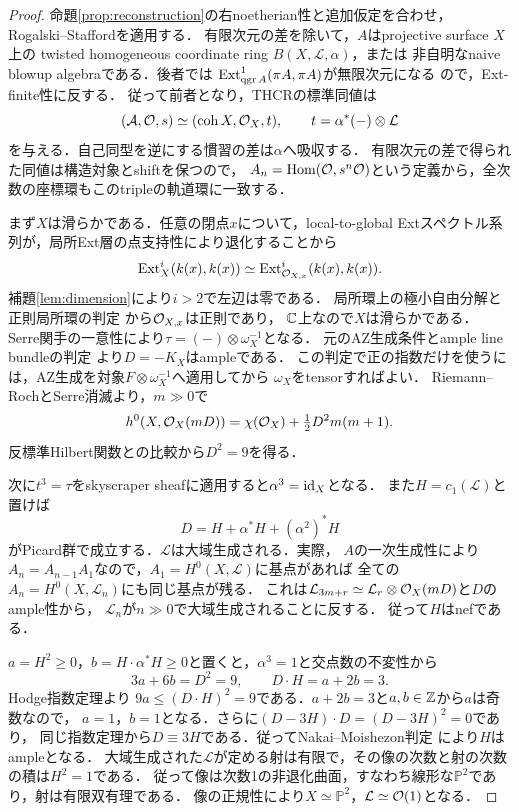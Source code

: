 \documentclass[11pt,a4paper]{ltjsarticle}
\begin{document}
\begin{proof}
命題\ref{prop:reconstruction}の右noetherian性と追加仮定を合わせ，
Rogalski--Stafford\cite[Theorem 1.1]{RSsurface}を適用する．
有限次元の差を除いて，$A$はprojective surface $X$上の
twisted homogeneous coordinate ring $B(X,\mathcal L,\alpha)$，または
非自明なnaive blowup algebraである．後者では
$\operatorname{Ext}^1_{\operatorname{qgr} A}(\pi A,\pi A)$が無限次元になる
\cite[Corollary 1.2(II)(f)]{RSsurface}ので，Ext-finite性に反する．
従って前者となり，THCRの標準同値は
\[
 (\mathcal A,\mathcal O,s)\simeq(\operatorname{coh} X,\mathcal O_X,t),
 \qquad t=\alpha^*(-)\otimes\mathcal L
\]
を与える．自己同型を逆にする慣習の差は$\alpha$へ吸収する．
有限次元の差で得られた同値は構造対象とshiftを保つので，
$A_n=\operatorname{Hom}(\mathcal O,s^n\mathcal O)$という定義から，全次数の座標環もこのtripleの軌道環に一致する．

まず$X$は滑らかである．任意の閉点$x$について，local-to-global Extスペクトル系列が，局所Ext層の点支持性により退化することから
\[
 \operatorname{Ext}^i_X(k(x),k(x))\simeq
 \operatorname{Ext}^i_{\mathcal O_{X,x}}(k(x),k(x)).
\]
補題\ref{lem:dimension}により$i>2$で左辺は零である．
局所環上の極小自由分解と正則局所環の判定
\cite[Tag 065U, Proposition 10.110.5]{Stacks}から$\mathcal O_{X,x}$は正則であり，
$\mathbb C$上なので$X$は滑らかである．
Serre関手の一意性により$\tau=(-)\otimes\omega_X^{-1}$となる．
元のAZ生成条件とample line bundleの判定
\cite[Tag 01PR, Proposition 28.27.13]{Stacks}より$D=-K_X$はampleである．
この判定で正の指数だけを使うには，AZ生成を対象$F\otimes\omega_X^{-1}$へ適用してから
$\omega_X$をtensorすればよい．
Riemann--RochとSerre消滅より，$m\gg0$で
\[
 h^0(X,\mathcal O_X(mD))=\chi(\mathcal O_X)+\tfrac12D^2m(m+1).
\]
反標準Hilbert関数との比較から$D^2=9$を得る．

次に$t^3=\tau$をskyscraper sheafに適用すると$\alpha^3=\operatorname{id}_X$となる．
また$H=c_1(\mathcal L)$と置けば
\begin{equation}\label{eq:birational-norm}
 D=H+\alpha^*H+(\alpha^2)^*H
\end{equation}
がPicard群で成立する．$\mathcal L$は大域生成される．実際，
$A$の一次生成性により$A_n=A_{n-1}A_1$なので，$A_1=H^0(X,\mathcal L)$に基点があれば
全ての$A_n=H^0(X,\mathcal L_n)$にも同じ基点が残る．
これは$\mathcal L_{3m+r}\simeq\mathcal L_r\otimes\mathcal O_X(mD)$と$D$のample性から，
$\mathcal L_n$が$n\gg0$で大域生成されることに反する．
従って$H$はnefである．

$a=H^2\geq0$，$b=H\cdot\alpha^*H\geq0$と置くと，$\alpha^3=1$と交点数の不変性から
\[
 3a+6b=D^2=9,\qquad D\cdot H=a+2b=3.
\]
Hodge指数定理\cite[V, Theorem 1.9]{Hartshorne}より
$9a\leq(D\cdot H)^2=9$である．$a+2b=3$と$a,b\in\mathbb Z$から$a$は奇数なので，
$a=1$，$b=1$となる．さらに$(D-3H)\cdot D=(D-3H)^2=0$であり，
同じ指数定理から$D\equiv3H$である．従ってNakai--Moishezon判定
\cite[V, Theorem 1.10]{Hartshorne}により$H$はampleとなる．
大域生成された$\mathcal L$が定める射は有限で，その像の次数と射の次数の積は$H^2=1$である．
従って像は次数1の非退化曲面，すなわち線形な$\mathbb P^2$であり，射は有限双有理である．
像の正規性により$X\simeq\mathbb P^2$，$\mathcal L\simeq\mathcal O(1)$となる．


\end{proof}
\end{document}
